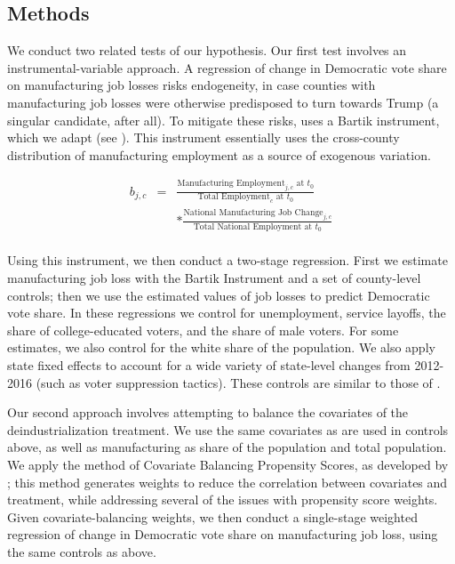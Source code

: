 \documentclass[]{AEA}
\begin{document}
\subsection{Methods} 
\label{methodssec}

We conduct two related tests of our hypothesis. Our first test involves
an instrumental-variable approach. A regression of change in Democratic
vote share on manufacturing job losses risks endogeneity, in case
counties with manufacturing job losses were otherwise predisposed to
turn towards Trump (a singular candidate, after all). To mitigate these
risks, \cite{Baccini21} uses a Bartik instrument, which we adapt (see
\cite{Bartik91}). This instrument essentially uses the cross-county
distribution of manufacturing employment as a source of exogenous
variation.

\[
\begin{aligned}
b_{j,c} &=& \frac{\text{Manufacturing Employment}_{j,c} \text{ at } t_0}{\text{Total Employment}_c \text{ at }t_0}  \\
&&  * \frac{\text{National Manufacturing Job Change}_{j,c} }{\text{Total National Employment at }t_0} \\
\end{aligned}
\]

Using this instrument, we then conduct a two-stage regression. First we
estimate manufacturing job loss with the Bartik Instrument and a set of
county-level controls; then we use the estimated values of job losses to
predict Democratic vote share. In these regressions we control for
unemployment, service layoffs, the share of college-educated voters, and
the share of male voters. For some estimates, we also control for the
white share of the population. We also apply state fixed effects to
account for a wide variety of state-level changes from 2012-2016 (such
as voter suppression tactics). These controls are similar to those of
\cite{Baccini21}.

Our second approach involves attempting to balance the covariates of the
deindustrialization treatment. We use the same covariates as are used in
controls above, as well as manufacturing as share of the population and
total population. We apply the method of Covariate Balancing Propensity
Scores, as developed by \cite{Imai14}; this method generates weights to
reduce the correlation between covariates and treatment, while
addressing several of the issues with propensity score weights. Given
covariate-balancing weights, we then conduct a single-stage weighted
regression of change in Democratic vote share on manufacturing job loss,
using the same controls as above.
\end{document}
